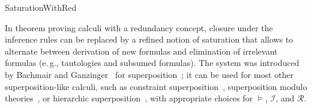 \begin{entry}{SaturationWithRed}
\begin{history}
In theorem proving calculi with a redundancy concept,
closure under the inference rules can be replaced by
a refined notion of saturation that allows to
alternate between derivation of new formulas and
elimination of irrelevant formulas
(e.\,g., tautologies and subsumed formulas).
The system was introduced by
Bachmair and Gan\-zin\-ger~\cite{BachmairGanzinger1990CTRS}
for superposition~;
it can be used for most other super\-posi\-tion-like calculi,
such as constraint superposition~,
superposition modulo theories~, or
hierarchic superposition~, with appropriate choices for
$\models$, $\mathcal{I}$, and $\mathcal{R}$.
\end{history}














\end{entry}
